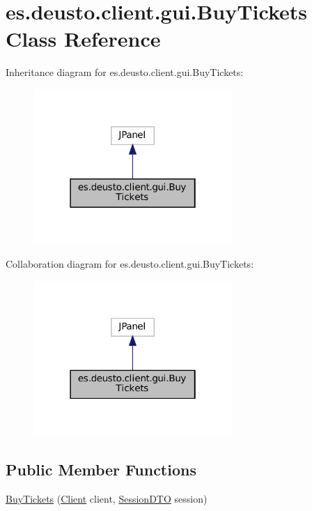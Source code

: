 \hypertarget{classes_1_1deusto_1_1client_1_1gui_1_1_buy_tickets}{}\section{es.\+deusto.\+client.\+gui.\+Buy\+Tickets Class Reference}
\label{classes_1_1deusto_1_1client_1_1gui_1_1_buy_tickets}


Inheritance diagram for es.\+deusto.\+client.\+gui.\+Buy\+Tickets\+:
\nopagebreak
\begin{figure}[H]
\begin{center}
\leavevmode
\includegraphics[width=214pt]{classes_1_1deusto_1_1client_1_1gui_1_1_buy_tickets__inherit__graph}
\end{center}
\end{figure}


Collaboration diagram for es.\+deusto.\+client.\+gui.\+Buy\+Tickets\+:
\nopagebreak
\begin{figure}[H]
\begin{center}
\leavevmode
\includegraphics[width=214pt]{classes_1_1deusto_1_1client_1_1gui_1_1_buy_tickets__coll__graph}
\end{center}
\end{figure}
\subsection*{Public Member Functions}
\begin{DoxyCompactItemize}
\item 
\mbox{\hyperlink{classes_1_1deusto_1_1client_1_1gui_1_1_buy_tickets_a550c5b4787c8ffd333049cf8d6c32e48}{Buy\+Tickets}} (\mbox{\hyperlink{classes_1_1deusto_1_1client_1_1_client}{Client}} client, \mbox{\hyperlink{classes_1_1deusto_1_1server_1_1data_1_1_session_d_t_o}{Session\+D\+TO}} session)
\end{DoxyCompactItemize}



